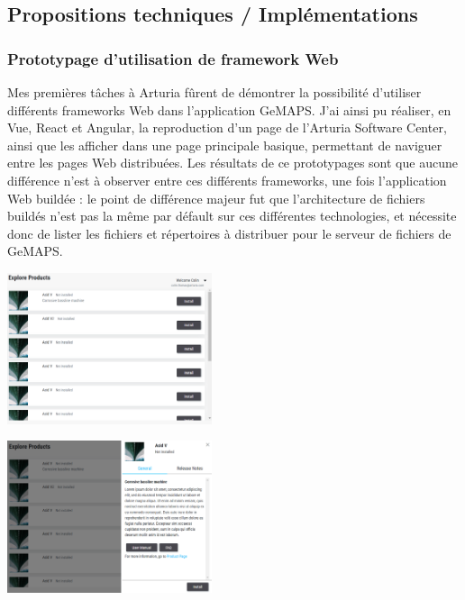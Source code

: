 \documentclass[francais]{rapportPFE}  %
\begin{document}
\subsection{Propositions techniques / Implémentations}
\subsubsection{Prototypage d'utilisation de framework Web}
Mes premières tâches à Arturia fûrent de démontrer la possibilité d'utiliser différents frameworks Web dans l'application GeMAPS.
J'ai ainsi pu réaliser, en Vue, React et Angular, la reproduction d'un page de l'Arturia Software Center, ainsi que les afficher dans une page principale basique, permettant de naviguer entre les pages Web distribuées. 
Les résultats de ce prototypages sont que aucune différence n'est à observer entre ces différents frameworks, une fois l'application Web buildée : le point de différence majeur fut que l'architecture de fichiers buildés n'est pas la même par défault sur ces différentes technologies, et nécessite donc de lister les fichiers et répertoires à distribuer pour le serveur de fichiers de GeMAPS.



\begin{center}
    \centering
    \begin{minipage}{.5\textwidth}
    \centering
    \includegraphics[width=6cm]{graphics/vue_demo.png}
    \label{fig:test1}
    \end{minipage}%
    \begin{minipage}{.5\textwidth}
    \centering
    \includegraphics[width=6cm]{graphics/vue_demo2.png}
    \label{fig:test2}
    \end{minipage}
    \end{center}
\end{document}
